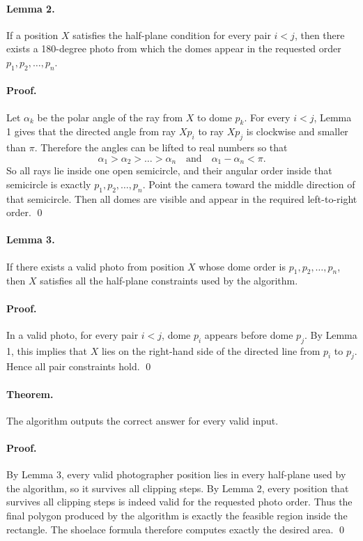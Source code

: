 \documentclass[11pt]{article}
\begin{document}
\paragraph{Lemma 2.}
If a position $X$ satisfies the half-plane condition for every pair $i < j$, then there exists a 180-degree photo from
which the domes appear in the requested order $p_1, p_2, \dots, p_n$.

\paragraph{Proof.}
Let $\alpha_k$ be the polar angle of the ray from $X$ to dome $p_k$.
For every $i < j$, Lemma 1 gives that the directed angle from ray $Xp_i$ to ray $Xp_j$ is clockwise and smaller than
$\pi$.
Therefore the angles can be lifted to real numbers so that
\[
    \alpha_1 > \alpha_2 > \dots > \alpha_n
    \quad\text{and}\quad
    \alpha_1 - \alpha_n < \pi.
\]
So all rays lie inside one open semicircle, and their angular order inside that semicircle is exactly
$p_1, p_2, \dots, p_n$.
Point the camera toward the middle direction of that semicircle.
Then all domes are visible and appear in the required left-to-right order. \qed

\paragraph{Lemma 3.}
If there exists a valid photo from position $X$ whose dome order is $p_1, p_2, \dots, p_n$, then $X$ satisfies all the
half-plane constraints used by the algorithm.

\paragraph{Proof.}
In a valid photo, for every pair $i < j$, dome $p_i$ appears before dome $p_j$.
By Lemma 1, this implies that $X$ lies on the right-hand side of the directed line from $p_i$ to $p_j$.
Hence all pair constraints hold. \qed

\paragraph{Theorem.}
The algorithm outputs the correct answer for every valid input.

\paragraph{Proof.}
By Lemma 3, every valid photographer position lies in every half-plane used by the algorithm, so it survives all
clipping steps.
By Lemma 2, every position that survives all clipping steps is indeed valid for the requested photo order.
Thus the final polygon produced by the algorithm is exactly the feasible region inside the rectangle.
The shoelace formula therefore computes exactly the desired area. \qed
\end{document}
